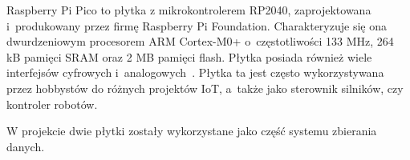 Raspberry Pi Pico to płytka z mikrokontrolerem RP2040, zaprojektowana i~produkowany przez firmę Raspberry Pi Foundation.
Charakteryzuje się ona dwurdzeniowym procesorem ARM Cortex-M0+ o~częstotliwości 133 MHz, 264 kB pamięci SRAM oraz 2 MB pamięci flash.
Płytka posiada również wiele interfejsów cyfrowych i~analogowych~\cite{PICO:datasheet}.
Płytka ta jest często wykorzystywana przez hobbystów do różnych projektów IoT, a~także jako sterownik silników, czy kontroler robotów\cite{PICO:doc}.

W projekcie dwie płytki zostały wykorzystane jako część systemu zbierania danych.


